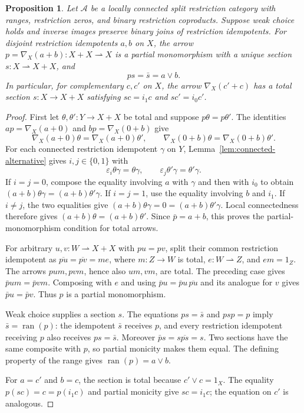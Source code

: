 \documentclass[11pt]{article}
\newtheorem{proposition}[theorem]{Proposition}
\newcommand{\ran}{\operatorname{ran}}
\begin{document}
\begin{proposition}\label{prop:local-switch}
Let $\mathcal A$ be a locally connected split restriction category with
ranges, restriction zeros, and binary restriction coproducts. Suppose
weak choice holds and inverse images preserve binary joins of
restriction idempotents.
For disjoint restriction idempotents $a,b$ on $X$, the arrow
$p=\nabla_X(a+b):X+X\rightharpoonup X$ is a partial monomorphism
with a unique section $s:X\rightharpoonup X+X$, and
\[
 ps=\bar s=a\vee b.
\]
In particular, for complementary $c,c'$ on $X$, the arrow
$\nabla_X(c'+c)$ has a total section $s:X\to X+X$ satisfying
$sc=i_1c$ and $sc'=i_0c'$.
\end{proposition}
\begin{proof}
First let $\theta,\theta':Y\to X+X$ be total and suppose
$p\theta=p\theta'$. The identities
$ap=\nabla_X(a+0)$ and $bp=\nabla_X(0+b)$ give
\[
 \nabla_X(a+0)\theta=\nabla_X(a+0)\theta',
 \qquad
 \nabla_X(0+b)\theta=\nabla_X(0+b)\theta'.
\]
For each connected restriction idempotent $\gamma$ on $Y$,
Lemma~\ref{lem:connected-alternative} gives $i,j\in\{0,1\}$ with
\[
 \varepsilon_i\theta\gamma=\theta\gamma,
 \qquad \varepsilon_j\theta'\gamma=\theta'\gamma.
\]
If $i=j=0$, compose the equality involving $a$ with $\gamma$ and
then with $i_0$ to obtain
$(a+b)\theta\gamma=(a+b)\theta'\gamma$.
If $i=j=1$, use the equality involving $b$ and $i_1$.
If $i\ne j$, the two equalities give
$(a+b)\theta\gamma=0=(a+b)\theta'\gamma$.
Local connectedness therefore gives
$(a+b)\theta=(a+b)\theta'$. Since $\bar p=a+b$, this proves the
partial-monomorphism condition for total arrows.

For arbitrary $u,v:W\rightharpoonup X+X$ with $pu=pv$, split their
common restriction idempotent as
$\overline{pu}=\overline{pv}=me$, where $m:Z\to W$ is total,
$e:W\rightharpoonup Z$, and $em=1_Z$. The arrows $pum,pvm$, hence also $um,vm$, are total.
The preceding case gives $\bar p um=\bar p vm$. Composing with $e$
and using $\bar p u=\bar p u\,\overline{pu}$ and its analogue for $v$
gives $\bar p u=\bar p v$. Thus $p$ is a partial monomorphism.

Weak choice supplies a section $s$. The equations $ps=\bar s$ and
$psp=p$ imply $\bar s=\ran(p)$: the idempotent $\bar s$ receives $p$,
and every restriction idempotent receiving $p$ also receives
$ps=\bar s$. Moreover
$\bar p s=s\overline{ps}=s$. Two sections have the same composite
with $p$, so partial monicity makes them equal.
The defining property of the range gives $\ran(p)=a\vee b$.

For $a=c'$ and $b=c$, the section is total because $c'\vee c=1_X$.
The equality $p(sc)=c=p(i_1c)$ and partial monicity give $sc=i_1c$;
the equation on $c'$ is analogous.
\end{proof}
\end{document}
